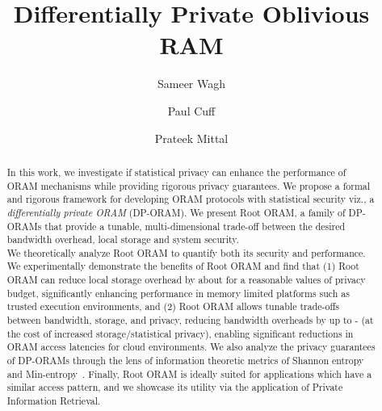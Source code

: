 \documentclass[USenglish,oneside,twocolumn]{article}
\newcommand{\ourprotocol}{Root ORAM}
\begin{document}
 
  \author*[1]{Sameer Wagh}
  \author[2]{Paul Cuff}
  \author[3]{Prateek Mittal}

\title{\huge Differentially Private Oblivious RAM}


\begin{abstract}
{In this work, we investigate if statistical privacy can 
enhance the performance of ORAM mechanisms while providing 
rigorous privacy guarantees. We propose a formal and rigorous framework for developing ORAM protocols with statistical security viz., a \textit{differentially private ORAM} (DP-ORAM).
We present \ourprotocol{}, a family of DP-ORAMs that provide a tunable, multi-dimensional 
trade-off between the desired bandwidth overhead, local storage and system security.\\
We theoretically analyze \ourprotocol{} to quantify both its security and performance.
We experimentally demonstrate the benefits of \ourprotocol{} and find that (1) \ourprotocol{} can reduce local storage overhead by about  for a reasonable values of privacy budget, significantly enhancing performance in memory limited platforms such as trusted execution environments, and (2) \ourprotocol{} allows tunable trade-offs between bandwidth, storage, and privacy, reducing bandwidth overheads by up to - (at the cost of increased storage/statistical privacy), enabling significant reductions in ORAM access latencies for cloud environments. We also analyze the privacy guarantees of DP-ORAMs through the lens of information theoretic metrics of Shannon entropy and Min-entropy~\cite{paulDP}. Finally, \ourprotocol{} is ideally suited for applications which have a similar access pattern, and we showcase its utility via the application of Private Information Retrieval.}
\end{abstract}






	\journalyear{}
 

\maketitle
\end{document}
